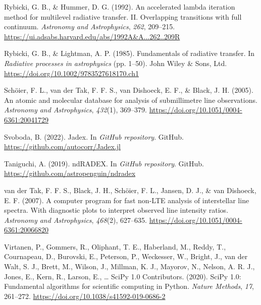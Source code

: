 \documentclass[
]{article}
\newlength{\cslhangindent}
\newenvironment{CSLReferences}[2] %
 {\begin{list}{}{%
  \setlength{\itemindent}{0pt}
  \setlength{\leftmargin}{0pt}
  \setlength{\parsep}{0pt}
  \ifodd #1
   \setlength{\leftmargin}{\cslhangindent}
   \setlength{\itemindent}{-1\cslhangindent}
  \fi
  \setlength{\itemsep}{#2\baselineskip}}}
 {\end{list}}
\begin{document}
\begin{CSLReferences}{1}{0}
Rybicki, G. B., \& Hummer, D. G. (1992). {An accelerated lambda
iteration method for multilevel radiative transfer. II. Overlapping
transitions with full continuum.} \emph{Astronomy and Astrophysics},
\emph{262}, 209--215.
\url{https://ui.adsabs.harvard.edu/abs/1992A&A...262..209R}

Rybicki, G. B., \& Lightman, A. P. (1985). Fundamentals of radiative
transfer. In \emph{Radiative processes in astrophysics} (pp. 1--50).
John Wiley \& Sons, Ltd. \url{https://doi.org/10.1002/9783527618170.ch1}

Schöier, F. L., van der Tak, F. F. S., van Dishoeck, E. F., \& Black, J.
H. (2005). {An atomic and molecular database for analysis of
submillimetre line observations}. \emph{Astronomy and Astrophysics},
\emph{432}(1), 369--379.
\url{https://doi.org/10.1051/0004-6361:20041729}

Svoboda, B. (2022). Jadex. In \emph{GitHub repository}. GitHub.
\url{https://github.com/autocorr/Jadex.jl}

Taniguchi, A. (2019). ndRADEX. In \emph{GitHub repository}. GitHub.
\url{https://github.com/astropenguin/ndradex}

van der Tak, F. F. S., Black, J. H., Schöier, F. L., Jansen, D. J., \&
van Dishoeck, E. F. (2007). {A computer program for fast non-LTE
analysis of interstellar line spectra. With diagnostic plots to
interpret observed line intensity ratios}. \emph{Astronomy and
Astrophysics}, \emph{468}(2), 627--635.
\url{https://doi.org/10.1051/0004-6361:20066820}

Virtanen, P., Gommers, R., Oliphant, T. E., Haberland, M., Reddy, T.,
Cournapeau, D., Burovski, E., Peterson, P., Weckesser, W., Bright, J.,
van der Walt, S. J., Brett, M., Wilson, J., Millman, K. J., Mayorov, N.,
Nelson, A. R. J., Jones, E., Kern, R., Larson, E., \ldots{} SciPy 1.0
Contributors. (2020). {SciPy} 1.0: Fundamental algorithms for scientific
computing in {Python}. \emph{Nature Methods}, \emph{17}, 261--272.
\url{https://doi.org/10.1038/s41592-019-0686-2}

\end{CSLReferences}
\end{document}
